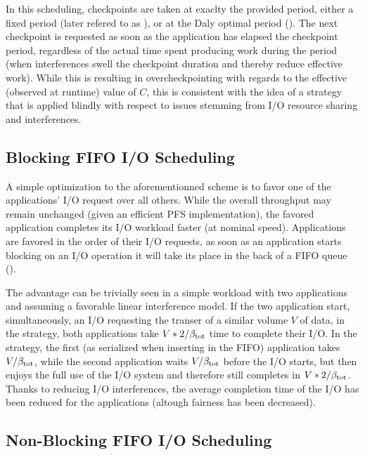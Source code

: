In this scheduling, checkpoints are taken at exaclty the provided
period, either a fixed period (later refered to as \propfixed), or at
the Daly optimal period (\propdaly).
The next checkpoint is requested as soon as the application has elapsed
the checkpoint period, regardless of the actual time spent
producing work during the period (\eg when interferences swell the
checkpoint duration and thereby reduce effective work). While this is
resulting in overcheckpointing with regards to the effective (\ie observed
at runtime) value of $C$, this is consistent with the idea of a
strategy that is applied blindly with respect to issues stemming from
I/O resource sharing and interferences.

\subsection{Blocking FIFO I/O Scheduling}

A simple optimization to the aforementionned scheme is to favor one of
the applications' I/O request over all others. While the overall throughput
may remain unchanged (given an efficient PFS implementation), the favored
application completes its I/O workload faster (\ie at nominal speed).
Applications are favored in the order of their I/O requests, \ie
as soon as an application starts blocking on an I/O operation it will
take its place in the back of a FIFO queue (\fifoblock).

The advantage can be trivially seen in a simple workload with two
applications and assuming a favorable linear interference model.
If the two application start, simultaneously, an I/O requesting the
transer of a similar volume $V$ of data, in the \nocoop strategy,
both applications take $V*2/\beta_{\text{tot}}$ time to complete their I/O.
In the \fifoblock strategy, the first (as serialized when inserting in
the FIFO) application takes $V/\beta_{\text{tot}}$, while the second application
waits $V/\beta_{\text{tot}}$ before the I/O starts, but then enjoys the full use of
the I/O system and therefore still completes in $V*2/\beta_{\text{tot}}$. Thanks
to reducing I/O interferences, the average completion time of the I/O
has been reduced for the applications (altough fairness has been decreased).


\subsection{Non-Blocking FIFO I/O Scheduling}

